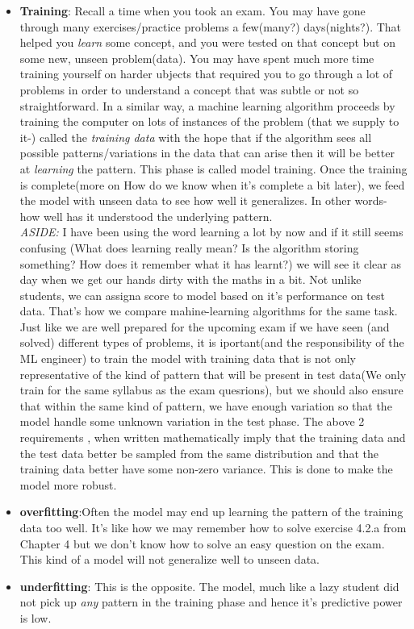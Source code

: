 \documentclass[]{article}
\begin{document}
\begin{itemize}
\begin{itemize}
\begin{itemize}
	\item \textbf{Training}: Recall a time when you took an exam. You may have gone through many exercises/practice problems a few(many?)  days(nights?). That  helped you \textit{learn} some concept, and you were tested on that concept but on some new, unseen problem(data). You may have spent much more time training yourself on harder ubjects that required you to go through a lot of problems in order to understand a concept that was subtle  or not so straightforward. In a similar way, a machine learning algorithm proceeds by training the computer on lots of instances of the problem (that we supply to it-) called the \textit{training data} with the hope that if the algorithm sees all possible patterns/variations in the data that can arise then it will be better at \textit{learning} the pattern. This phase is called model training. Once the training is complete(more on How do we know when it's complete  a bit later), we feed the model with unseen data to see how well it generalizes. In other words- how well has it understood the underlying pattern. \\
	\textit{ASIDE:} I have been using the word learning a lot by now and if it still seems confusing (What does learning really mean? Is the algorithm storing something? How does it remember what it has learnt?) we will see it clear as day when we get our hands dirty with the maths in a bit. Not unlike students, we can assigna score to model based on it's performance on test data. That's how we compare mahine-learning algorithms for the same task. Just like we are well prepared for the upcoming exam if we have seen (and solved) different types of problems, it is iportant(and the responsibility of the ML engineer) to train the model with training data that is not only representative of the kind of pattern that will be present in test data(We only train for the same syllabus as the exam quesrions), but we should also ensure that within the same kind of pattern, we have enough variation so that the model handle some unknown variation in the test phase.
	The above 2 requirements , when written mathematically imply that the training data and the test data better be sampled from the same distribution and that the training data better have some non-zero variance. This is done to make the model more robust.
	\item \textbf{overfitting}:Often the model may end up learning the pattern of the training data too well. It's like how we may remember how to solve exercise 4.2.a from Chapter 4 but we don't know how to solve an easy question on the exam. This kind of a model will not generalize well to unseen data.
	\item \textbf{underfitting}: This is the opposite. The model, much like a lazy student did not pick up \textit{any} pattern in the training phase and hence it's predictive power is low.
	

\end{itemize}
\end{itemize}
\end{itemize}
\end{document}
